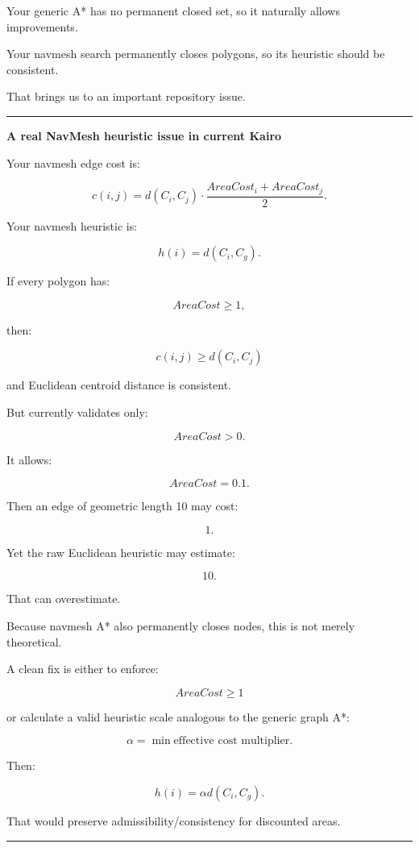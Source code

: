 Your generic A* has no permanent closed set, so it naturally allows improvements.

Your navmesh search permanently closes polygons, so its heuristic should be consistent.

That brings us to an important repository issue.

\begin{center}\rule{0.5\linewidth}{0.5pt}\end{center}

\textbf{A real NavMesh heuristic issue in current Kairo}

Your navmesh edge cost is:

\[
c(i,j)
=
d(C_i,C_j)
\cdot
\frac{
AreaCost_i+AreaCost_j
}{2}.
\]

Your navmesh heuristic is:

\[
h(i)
=
d(C_i,C_g).
\]

If every polygon has:

\[
AreaCost\ge1,
\]

then:

\[
c(i,j)\ge d(C_i,C_j)
\]

and Euclidean centroid distance is consistent.

But  currently validates only:

\[
AreaCost>0.
\]

It allows:

\[
AreaCost=0.1.
\]

Then an edge of geometric length 10 may cost:

\[
1.
\]

Yet the raw Euclidean heuristic may estimate:

\[
10.
\]

That can overestimate.

Because navmesh A* also permanently closes nodes, this is not merely theoretical.

A clean fix is either to enforce:

\[
AreaCost\ge1
\]

or calculate a valid heuristic scale analogous to the generic graph A*:

\[
\alpha
=
\min
\text{effective cost multiplier}.
\]

Then:

\[
h(i)
=
\alpha d(C_i,C_g).
\]

That would preserve admissibility/consistency for discounted areas.

\begin{center}\rule{0.5\linewidth}{0.5pt}\end{center}

